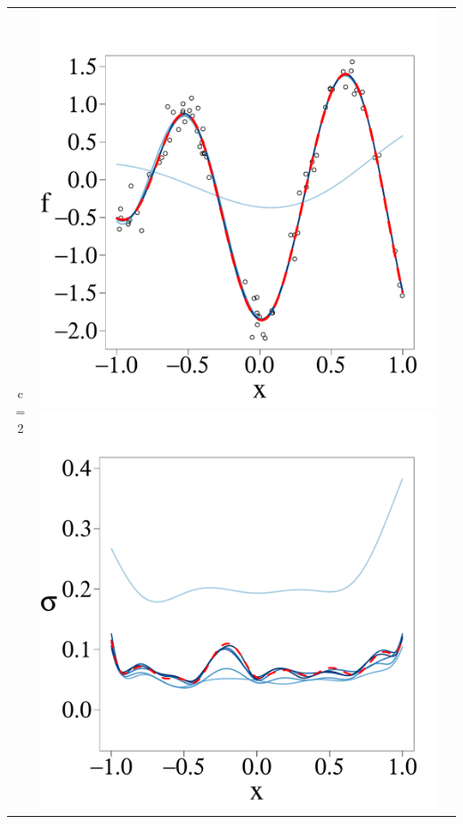 \documentclass[8pt]{beamer} %
\begin{document}
\begin{frame}
\begin{itemize}
\begin{adjustwidth}{-4.3em}{-3em}
\begin{tabular}{ c c c }
\hline
c = 2 &
\includegraphics[scale=0.17, trim = 0mm 14mm 0mm 14mm, clip]{ch5_fig3_Post_part5.pdf} 
\includegraphics[scale=0.17, trim = 0mm 14mm 0mm 14mm, clip]{ch5_fig3_Sigma_part5.pdf} 

\end{tabular}
\end{adjustwidth}
\end{itemize}
\end{frame}
\end{document}
